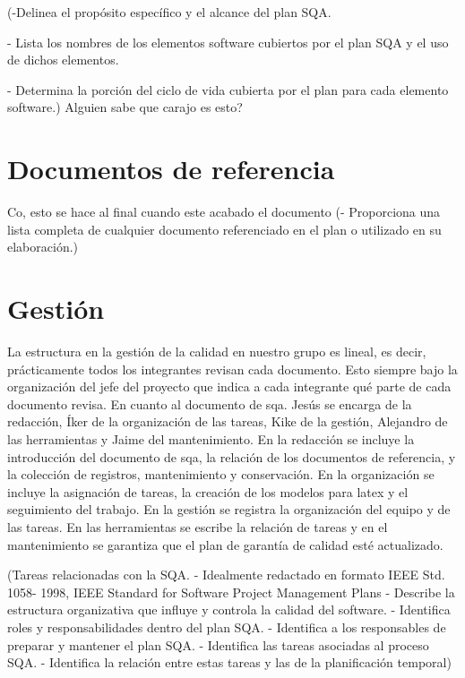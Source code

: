 \documentclass[spanish,a4paper,11pt, twoside]{report}	%
\begin{document}
	(-Delinea el propósito específico y el alcance del plan	SQA.

	- Lista los nombres de los elementos software cubiertos por el plan SQA y el uso de dichos elementos.
		
	- Determina la porción del ciclo de vida cubierta por el plan para cada elemento software.) Alguien sabe que carajo es esto?

\newpage
\mbox{}
\thispagestyle{empty}						%
\newpage

\chapter{ Documentos de referencia}
	Co, esto se hace al final cuando este acabado el documento
	(- Proporciona una lista completa de cualquier documento referenciado en el plan o utilizado en su elaboración.)

\newpage
\mbox{}
\thispagestyle{empty}						%
\newpage

\chapter{ Gestión}%
	La estructura en la gestión de la calidad en nuestro grupo es lineal, es decir, prácticamente todos los integrantes revisan cada documento. Esto siempre bajo la organización del 
	jefe del proyecto que indica a cada integrante qué parte de cada documento revisa. En cuanto al documento de sqa. Jesús se encarga de la redacción, Íker de la organización de las tareas, Kike de la 
	gestión, Alejandro de las herramientas y Jaime del mantenimiento.
	En la redacción se incluye la introducción del documento de sqa, la relación de los documentos de referencia, y la colección de registros, mantenimiento y conservación. En la organización se incluye la asignación de tareas, 
	la creación de los modelos para latex y el seguimiento del trabajo. En la gestión se registra la organización del equipo y de las tareas. En las herramientas se escribe la relación de tareas y en el mantenimiento se garantiza
	que el plan de garantía de calidad esté actualizado.


	(Tareas relacionadas con la SQA.
	- Idealmente redactado en formato IEEE Std. 1058-
	1998, IEEE Standard for Software Project
	Management Plans
	- Describe la estructura organizativa que influye y
	controla la calidad del software.
	- Identifica roles y responsabilidades dentro del plan
	SQA.
	- Identifica a los responsables de preparar y mantener
	el plan SQA.
	- Identifica las tareas asociadas al proceso SQA.
	- Identifica la relación entre estas tareas y las de la
	planificación temporal)
\end{document}

